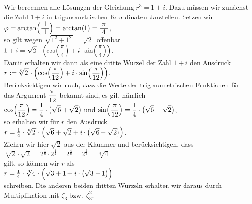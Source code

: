 \example Wir berechnen alle L\"{o}sungen der Gleichung $r^3 = 1 + i$.  Dazu m\"{u}ssen wir zun\"{a}chst die Zahl $1 +
i$ in trigonometrischen Koordinaten darstellen.  Setzen wir
\\[0.2cm]
\hspace*{1.3cm} $\varphi = \arctan\Bigl(\bruch{1}{1}\Bigr) = \arctan(1) = \bruch{\pi}{4}$,
\\[0.2cm]
so gilt wegen $\sqrt{1^2 + 1^2\,} = \sqrt{2\,}$ offenbar
\\[0.2cm]
\hspace*{1.3cm} $\displaystyle1 + i = \sqrt{2\,} \cdot \left(\cos\Bigl(\frac{\pi}{4}\Bigr) + i \cdot \sin\Bigl(\frac{\pi}{4}\Bigr)\right)$.
\\[0.2cm]
Damit erhalten wir dann als eine dritte Wurzel der Zahl $1 + i$ den Ausdruck
\\[0.2cm]
\hspace*{1.3cm}
$\displaystyle r := \sqrt[6]{2\,} \cdot 
      \left(\cos\Bigl(\frac{\pi}{12}\Bigr) + i \cdot \sin\Bigl(\frac{\pi}{12}\Bigr)\right) 
$.
\\[0.2cm]
Ber\"{u}cksichtigen wir noch, dass die Werte der trigonometrischen Funktionen f\"{u}r das Argument
$\displaystyle\frac{\pi}{12}$ bekannt sind, es gilt n\"{a}mlich
\\[0.2cm]
\hspace*{1.3cm} 
$\displaystyle\cos\Bigl(\frac{\pi}{12}\Bigr) = \frac{1}{4} \cdot \bigl(\sqrt{6} + \sqrt{2}\bigr)$ \quad und \quad
$\displaystyle\sin\Bigl(\frac{\pi}{12}\Bigr) = \frac{1}{4} \cdot \bigl(\sqrt{6} - \sqrt{2}\bigr)$,
\\[0.2cm]
so erhalten wir f\"{u}r $r$ den Ausdruck
\\[0.2cm]
\hspace*{1.3cm}
$r = \frac{1}{4} \cdot \sqrt[6]{2\,} \cdot
     \Bigl(\sqrt{6} + \sqrt{2} + i \cdot \bigl(\sqrt{6} - \sqrt{2}\bigr)\Bigr) 
$.
\\[0.2cm]
Ziehen wir hier $\sqrt{2}$ aus der Klammer und ber\"{u}cksichtigen, dass
\\[0.2cm]
\hspace*{1.3cm}
$\sqrt[6]{2} \cdot \sqrt{2} = 2^{\frac{1}{6}} \cdot 2^{\frac{1}{2}} =
 2^{\frac{4}{6}} =  2^{\frac{2}{3}} = \sqrt[3]{4}
$
\\[0.2cm]
gilt, so k\"{o}nnen wir $r$ als
\\[0.2cm]
\hspace*{1.3cm}
$r = \frac{1}{4} \cdot \sqrt[3]{4\,} \cdot \Bigl(\sqrt{3} + 1 + i \cdot \bigl(\sqrt{3} - 1\bigr)\Bigr)$
\\[0.2cm]
schreiben.  Die anderen beiden dritten Wurzeln erhalten wir daraus durch Multiplikation mit
$\zeta_3$ bzw.~$\zeta_3^2$.

